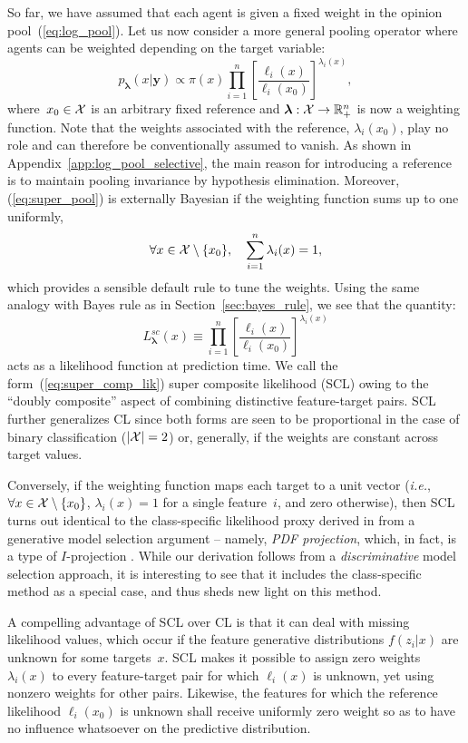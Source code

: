 \documentclass[english]{scrartcl}
\def\y{{\mathbf{y}}}
\newcommand{\blambda}{{\boldsymbol{\lambda}}}
\begin{document}
So far, we have assumed that each agent is given a fixed weight in the opinion pool~(\ref{eq:log_pool}). Let us now consider a more general pooling operator where agents can be weighted depending on the target variable:
\begin{equation}
\label{eq:super_pool}
p_\blambda(x|\y) \propto \pi(x) \prod_{i=1}^n \left[\frac{\ell_i(x)}{\ell_i(x_0)}\right]^{\lambda_i(x)},    
\end{equation}
where~$x_0\in{\cal X}$ is an arbitrary fixed reference and $\blambda: {\cal X}\to \mathbb{R}_+^n$ is now a weighting function. Note that the weights associated with the reference, $\lambda_i(x_0)$, play no role and can therefore be conventionally assumed to vanish. As shown in Appendix~\ref{app:log_pool_selective}, the main reason for introducing a reference is to maintain pooling invariance by hypothesis elimination. Moreover, (\ref{eq:super_pool}) is externally Bayesian if the weighting function sums up to one uniformly,
$$
\forall x\in{\cal X}\setminus \{x_0\},\quad
\sum_{i=1}^n \lambda_i(x) = 1,
$$
which provides a sensible default rule to tune the weights. Using the same analogy with Bayes rule as in Section~\ref{sec:bayes_rule}, we see that the quantity:
\begin{equation}
\label{eq:super_comp_lik}
L^{sc}_\blambda(x) \equiv 
\prod_{i=1}^n \left[\frac{\ell_i(x)}{\ell_i(x_0)}\right]^{\lambda_i(x)}
\end{equation}
acts as a likelihood function at prediction time. We call the form~(\ref{eq:super_comp_lik}) super composite likelihood (SCL) owing to the ``doubly composite'' aspect of combining distinctive feature-target pairs. SCL further generalizes CL since both forms are seen to be proportional in the case of binary classification ($|{\cal X}|=2$) or, generally, if the weights are constant across target values.

Conversely, if the weighting function maps each target to a unit vector ({\em i.e.}, $\forall x\in{\cal X}\setminus \{x_0\}$, $\lambda_i(x)=1$ for a single feature~$i$, and zero otherwise), then SCL turns out identical to the class-specific likelihood proxy derived in \cite{Baggenstoss-03} from a generative model selection argument -- namely, {\em PDF projection}, which, in fact, is a type of $I$-projection \cite{Minka-04}. While our derivation follows from a {\em discriminative} model selection approach, it is interesting to see that it includes the class-specific method as a special case, and thus sheds new light on this method.

A compelling advantage of SCL over CL is that it can deal with missing likelihood values, which occur if the feature generative distributions $f(z_i|x)$ are unknown for some targets~$x$. SCL makes it possible to assign zero weights $\lambda_i(x)$ to every feature-target pair for which $\ell_i(x)$ is unknown, yet using nonzero weights for other pairs. Likewise, the features for which the reference likelihood $\ell_i(x_0)$ is unknown shall receive uniformly zero weight so as to have no influence whatsoever on the predictive distribution.
\end{document}
